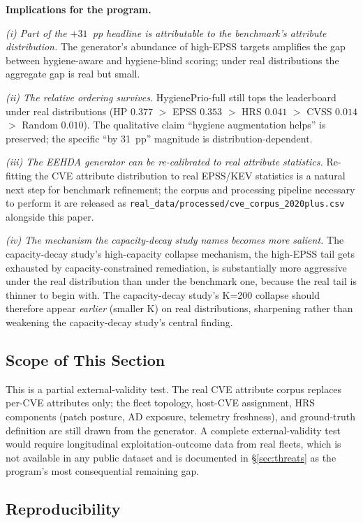 \textbf{Implications for the program.}

\textit{(i) Part of the $+31$~pp headline is attributable to the
benchmark's attribute distribution.} The generator's
abundance of high-EPSS targets amplifies the gap between
hygiene-aware and hygiene-blind scoring; under real distributions
the aggregate gap is real but small.

\textit{(ii) The relative ordering survives.} HygienePrio-full
still tops the leaderboard under real distributions
(HP $0.377$ $>$ EPSS $0.353$ $>$ HRS $0.041$ $>$ CVSS $0.014$
$>$ Random $0.010$). The qualitative claim ``hygiene augmentation
helps'' is preserved; the specific ``by 31~pp'' magnitude is
distribution-dependent.

\textit{(iii) The EEHDA generator can be re-calibrated to real attribute statistics.} Re-fitting the
CVE attribute distribution to real
EPSS/KEV statistics is a natural next step for benchmark refinement; the corpus and processing pipeline
necessary to perform it are released as
\texttt{real\_data/\allowbreak processed/\allowbreak cve\_corpus\_2020plus.csv} alongside
this paper.

\textit{(iv) The mechanism the capacity-decay study names becomes more salient.}
The capacity-decay study's high-capacity collapse mechanism, the high-EPSS tail
gets exhausted by capacity-constrained remediation, is
substantially more aggressive under the real distribution than
under the benchmark one, because the real tail is thinner to begin
with. The capacity-decay study's K=200 collapse should therefore appear
\textit{earlier} (smaller K) on real distributions, sharpening
rather than weakening the capacity-decay study's central finding.

\subsection{Scope of This Section}

This is a partial external-validity test. The real CVE attribute corpus
replaces per-CVE attributes only; the fleet topology,
host-CVE assignment, HRS components (patch posture, AD exposure,
telemetry freshness), and ground-truth definition are still drawn from the generator.
A complete external-validity test would require longitudinal
exploitation-outcome data from real fleets, which is not
available in any public dataset and is documented in
\S\ref{sec:threats} as the program's most consequential remaining
gap.

\subsection{Reproducibility}

